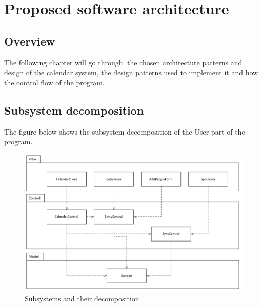 \section{Proposed software architecture}
\subsection{Overview}
The following chapter will go through: the chosen architecture patterns and design of the calendar system, the design patterns used to implement it and how the control flow of the program.
\subsection{Subsystem decomposition}
The figure below shows the subsystem decomposition of the User part of the program.
\begin{figure}[h]
\centering
\includegraphics[scale = 0.6]{systemModel}
\caption{Subsystems and their decomposition}
\end{figure}